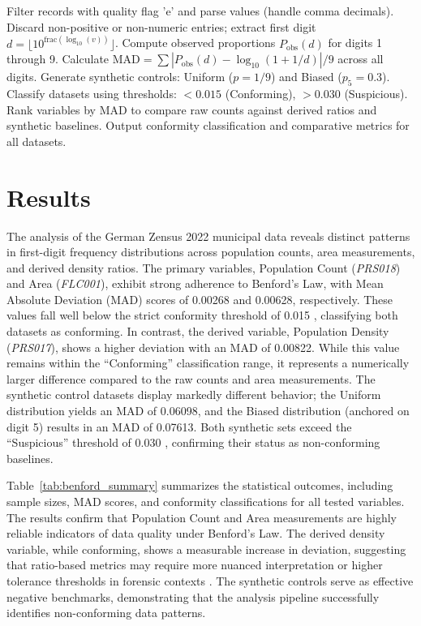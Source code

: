 \documentclass[11pt,a4paper]{article}
\begin{document}
\begin{algorithm}[t]
\caption{Benford Conformity Analysis Pipeline}
\label{alg:benford_pipeline}
\begin{algorithmic}[1]
\State Filter records with quality flag 'e' and parse values (handle comma decimals).
\State Discard non-positive or non-numeric entries; extract first digit $d = \lfloor 10^{\text{frac}(\log_{10}(v))} \rfloor$.
\State Compute observed proportions $P_{\text{obs}}(d)$ for digits 1 through 9.
\State Calculate $\text{MAD} = \sum |P_{\text{obs}}(d) - \log_{10}(1+1/d)| / 9$ across all digits.
\State Generate synthetic controls: Uniform ($p=1/9$) and Biased ($p_5=0.3$).
\State Classify datasets using thresholds: $<0.015$ (Conforming), $>0.030$ (Suspicious).
\State Rank variables by MAD to compare raw counts against derived ratios and synthetic baselines.
\State Output conformity classification and comparative metrics for all datasets.
\end{algorithmic}
\end{algorithm}

\section{Results}
The analysis of the German Zensus 2022 municipal data reveals distinct patterns in first-digit frequency distributions across population counts, area measurements, and derived density ratios. The primary variables, Population Count (\textit{PRS018}) and Area (\textit{FLC001}), exhibit strong adherence to Benford's Law, with Mean Absolute Deviation (MAD) scores of 0.00268 and 0.00628, respectively. These values fall well below the strict conformity threshold of 0.015 \cite{Durtschi2004TheEU}, classifying both datasets as conforming. In contrast, the derived variable, Population Density (\textit{PRS017}), shows a higher deviation with an MAD of 0.00822. While this value remains within the ``Conforming'' classification range, it represents a numerically larger difference compared to the raw counts and area measurements. The synthetic control datasets display markedly different behavior; the Uniform distribution yields an MAD of 0.06098, and the Biased distribution (anchored on digit 5) results in an MAD of 0.07613. Both synthetic sets exceed the ``Suspicious'' threshold of 0.030 \cite{Durtschi2004TheEU}, confirming their status as non-conforming baselines.

Table~\ref{tab:benford_summary} summarizes the statistical outcomes, including sample sizes, MAD scores, and conformity classifications for all tested variables. The results confirm that Population Count and Area measurements are highly reliable indicators of data quality under Benford's Law. The derived density variable, while conforming, shows a measurable increase in deviation, suggesting that ratio-based metrics may require more nuanced interpretation or higher tolerance thresholds in forensic contexts \cite{Druica2018BenfordsLA}. The synthetic controls serve as effective negative benchmarks, demonstrating that the analysis pipeline successfully identifies non-conforming data patterns.
\end{document}
